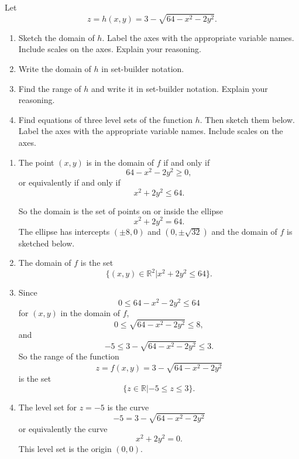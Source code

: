 \documentclass{ximera}
\begin{document}
\begin{question} \label{Q111QWQWQ}
Let 
\[
     z = h(x,y) = 3 - \sqrt{64 - x^2 - 2y^2} .
\] 

\begin{enumerate}
\item Sketch the domain of $h$. Label the axes with the appropriate variable names. Include scales on the axes. Explain your reasoning.

\item Write the domain of $h$ in set-builder notation.

\item Find the range of $h$ and write it in set-builder notation. Explain your reasoning.

\item Find equations of three level sets of the function $h$. Then sketch them below. Label the axes with the appropriate variable names. Include scales on the axes. 

\end{enumerate}

\begin{explanation}
\begin{enumerate}
\item The point $(x,y)$ is in the domain of $f$ if and only if
\[
          64 - x^2 - 2y^2 \geq 0,
\]
or equivalently if and only if
\[
    x^2 + 2y^2 \leq 64.
\]

So the domain is the set of points on or inside the ellipse
\[
       x^2 + 2y^2 = 64.
\]
The ellipse has intercepts $(\pm 8, 0)$ and $(0, \pm \sqrt{32})$ and the domain of $f$ is sketched below.

\begin{onlineOnly}
    \begin{center}
\end{center}
\end{onlineOnly}

\item The domain of $f$ is the set
\[
 \{ (x,y)\in \mathbb{R}^2 |  x^2 + 2y^2 \leq 64  \}.
\]

\item Since 
\[
     0\leq  64 - x^2 - 2y^2 \leq 64
\]
for $(x,y)$ in the domain of $f$,
\[
  0\leq  \sqrt{64 - x^2 - 2y^2} \leq 8, 
\]
and
\[
   -5 \leq 3 - \sqrt{64 - x^2 - 2y^2} \leq 3 .
\]
So the range of the function
\[
  z = f(x,y) = 3 - \sqrt{64 - x^2 - 2y^2}
\]
is the set
\[
 \{ z \in \mathbb{R} | -5 \leq z \leq 3 \}.
\]

\item The level set for $z=-5$ is the curve
\[
   -5 = 3 - \sqrt{64 - x^2 - 2y^2}
\]
or  equivalently the curve
\[
     x^2 + 2y^2 = 0.
\]
This level set is the origin $(0,0)$.


\end{enumerate}
\end{explanation}
\end{question}
\end{document}
